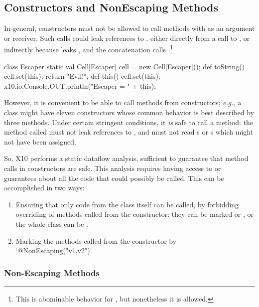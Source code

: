 \subsection{Constructors and NonEscaping Methods}

In general, constructors must not be allowed to call methods with as
an argument or receiver. Such calls could leak references to ,
either directly from a call to , or indirectly because
 leaks , and the concatenation 
 calls .\footnote{This is abominable behavior for 
, but nonetheless it is allowed.}
\begin{xten}
class Escaper {
  static val Cell[Escaper] cell = new Cell[Escaper]();
  def toString() {
    cell.set(this);
    return "Evil!";
  }
  def this() {
    cell.set(this);
    x10.io.Console.OUT.println("Escaper = " + this);
  }
}
\end{xten}
%

However, it is convenient to be able to call methods from constructors; {\em
e.g.}, a class might have eleven constructors whose common behavior is best
described by three methods.  
Under certain stringent conditions, it {\em is}
safe to call a method: the method called must not leak references to
, and must not read s or s which might not have
been assigned.   

So, X10 performs a static dataflow analysis, sufficient to guarantee that
method calls in constructors are safe.  This analysis requires having access
to or guarantees about all the code that could possibly be called.  This can
be accomplished in two ways: 
\begin{enumerate}
\item Ensuring that only code from the class itself can be called, by 
      forbidding overriding of
      methods called from the constructor: they can be marked  or
      , or the whole class can be .
\item Marking the methods called from the constructor by
      \xcd`@NonEscaping("v1,v2")`.
\end{enumerate}

\subsubsection{Non-Escaping Methods}



